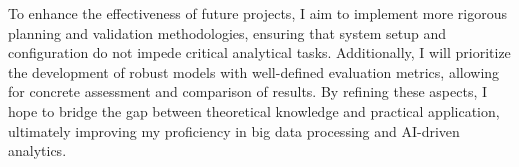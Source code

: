 \documentclass[12pt,a4paper]{article}
\begin{document}
\begin{multicols}{2}
To enhance the effectiveness of future projects, I aim to implement more rigorous planning and validation methodologies, ensuring that system setup and configuration do not impede critical analytical tasks. Additionally, I will prioritize the development of robust models with well-defined evaluation metrics, allowing for concrete assessment and comparison of results. By refining these aspects, I hope to bridge the gap between theoretical knowledge and practical application, ultimately improving my proficiency in big data processing and AI-driven analytics.

\end{multicols}



\end{document}
